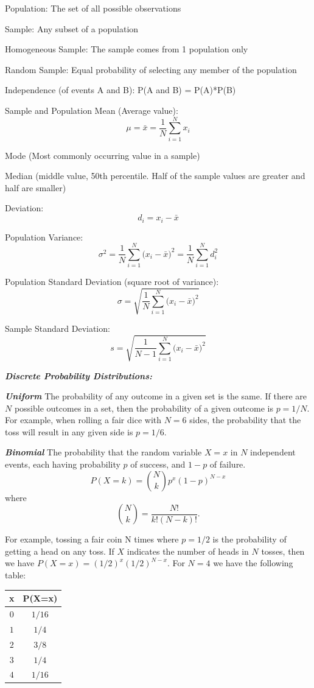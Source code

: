\documentclass[
]{book}
\begin{document}
Population: The set of all possible observations

Sample: Any subset of a population

Homogeneous Sample: The sample comes from 1 population only

Random Sample: Equal probability of selecting any member of the population

Independence (of events A and B): P(A and B) = P(A)*P(B)

Sample and Population Mean (Average value):
\[\mu = \bar{x} = \frac{1}{N} \sum_{i=1}^N{x_i} \]

Mode (Most commonly occurring value in a sample)

Median (middle value, 50th percentile. Half of the sample values are greater and half are smaller)

Deviation:
\[d_i = x_i - \bar{x} \]

Population Variance:
\[\sigma^2 =  \frac{1}{N} \sum_{i=1}^N{(x_i - \bar{x}})^2 = \frac{1}{N} \sum_{i=1}^N{d_i^2}\]

Population Standard Deviation (square root of variance):
\[\sigma = \sqrt{\frac{1}{N} \sum_{i=1}^N{(x_i - \bar{x}})^2} \]

Sample Standard Deviation:
\[s = \sqrt{\frac{1}{N-1} \sum_{i=1}^N{(x_i - \bar{x}})^2} \]

\textbf{\emph{Discrete Probability Distributions:}}

\textbf{\emph{Uniform}}
The probability of any outcome in a given set is the same. If there are \(N\) possible outcomes in a set, then the probability of a given outcome is \(p=1/N\). For example, when rolling a fair dice with \(N=6\) sides, the probability that the toss will result in any given side is \(p = 1/6\).

\textbf{\emph{Binomial}}
The probability that the random variable \(X = x\) in \(N\) independent events, each having probability \(p\) of success, and \(1-p\) of failure.
\[P(X = k) = \binom{N}{k}p^x (1-p)^{N-x}\] where
\[\binom{N}{k} = \frac{N!}{k!(N-k)!}.\]

For example, tossing a fair coin N times where \(p = 1/2\) is the probability of getting a head on any toss. If \(X\) indicates the number of heads in \(N\) tosses, then we have \(P(X = x) = (1/2)^x (1/2)^{N-x}\). For \(N = 4\) we have the following table:

\begin{longtable}[]{@{}cc@{}}
\toprule
x & P(X=x)\tabularnewline
\midrule
\endhead
\(0\) & \(1/16\)\tabularnewline
\(1\) & \(1/4\)\tabularnewline
\(2\) & \(3/8\)\tabularnewline
\(3\) & \(1/4\)\tabularnewline
\(4\) & \(1/16\)\tabularnewline
\bottomrule
\end{longtable}
\end{document}
